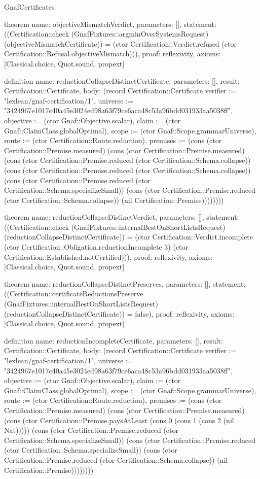 \begin{lexlean}{GnafCertificates}
\begin{semanticmodule}
theorem{
  name: objectiveMismatchVerdict,
  parameters: [],
  statement: ((Certification::check (GnafFixtures::argminOverSystemsRequest) (objectiveMismatchCertificate)) = (ctor Certification::Verdict.refused (ctor Certification::Refusal.objectiveMismatch))),
  proof: reflexivity{},
  axioms: [Classical.choice, Quot.sound, propext]
}

definition{
  name: reductionCollapseDistinctCertificate,
  parameters: [],
  result: Certification::Certificate,
  body: (record Certification::Certificate {verifier := "lexlean/gnaf-certification/1", universe := "3424967e1017c40a45e3024ed98a63f79ce6aca48c53a96bdd031933aa5038ff", objective := (ctor Gnaf::Objective.scalar), claim := (ctor Gnaf::ClaimClass.globalOptimal), scope := (ctor Gnaf::Scope.grammarUniverse), route := (ctor Certification::Route.reduction), premises := (cons (ctor Certification::Premise.measured) (cons (ctor Certification::Premise.measured) (cons (ctor Certification::Premise.reduced (ctor Certification::Schema.collapse)) (cons (ctor Certification::Premise.reduced (ctor Certification::Schema.collapse)) (cons (ctor Certification::Premise.reduced (ctor Certification::Schema.specializeSmall)) (cons (ctor Certification::Premise.reduced (ctor Certification::Schema.collapse)) (nil Certification::Premise)))))))})
}

theorem{
  name: reductionCollapseDistinctVerdict,
  parameters: [],
  statement: ((Certification::check (GnafFixtures::internalBestOnShortListsRequest) (reductionCollapseDistinctCertificate)) = (ctor Certification::Verdict.incomplete (ctor Certification::Obligation.reductionIncomplete 3) (ctor Certification::Established.notCertified))),
  proof: reflexivity{},
  axioms: [Classical.choice, Quot.sound, propext]
}

theorem{
  name: reductionCollapseDistinctPreserves,
  parameters: [],
  statement: ((Certification::certificateReductionsPreserve (GnafFixtures::internalBestOnShortListsRequest) (reductionCollapseDistinctCertificate)) = false),
  proof: reflexivity{},
  axioms: [Classical.choice, Quot.sound, propext]
}

definition{
  name: reductionIncompleteCertificate,
  parameters: [],
  result: Certification::Certificate,
  body: (record Certification::Certificate {verifier := "lexlean/gnaf-certification/1", universe := "3424967e1017c40a45e3024ed98a63f79ce6aca48c53a96bdd031933aa5038ff", objective := (ctor Gnaf::Objective.scalar), claim := (ctor Gnaf::ClaimClass.globalOptimal), scope := (ctor Gnaf::Scope.grammarUniverse), route := (ctor Certification::Route.reduction), premises := (cons (ctor Certification::Premise.measured) (cons (ctor Certification::Premise.measured) (cons (ctor Certification::Premise.paysAtLeast (cons 0 (cons 1 (cons 2 (nil Nat))))) (cons (ctor Certification::Premise.reduced (ctor Certification::Schema.specializeSmall)) (cons (ctor Certification::Premise.reduced (ctor Certification::Schema.specializeSmall)) (cons (ctor Certification::Premise.reduced (ctor Certification::Schema.collapse)) (nil Certification::Premise)))))))})
}


\end{semanticmodule}
\end{lexlean}
